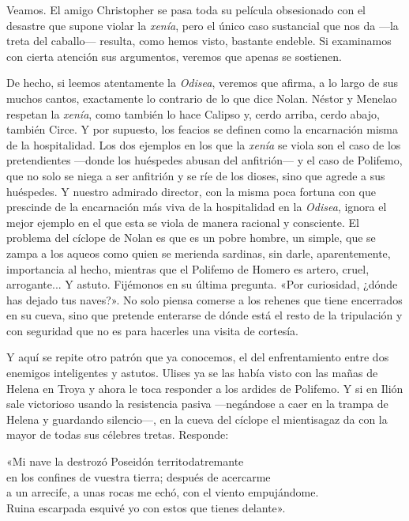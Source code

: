 Veamos. El amigo Christopher se pasa toda su película obsesionado con el desastre que supone violar la \emph{xenía}, pero el único caso sustancial que nos da ---la treta del caballo--- resulta, como hemos visto, bastante endeble. Si examinamos con cierta atención sus argumentos, veremos que apenas se sostienen.

De hecho, si leemos atentamente la \emph{Odisea}, veremos que afirma, a lo largo de sus muchos cantos, exactamente lo contrario de lo que dice Nolan. Néstor y Menelao respetan la \emph{xenía}, como también lo hace Calipso y, cerdo arriba, cerdo abajo, también Circe. Y por supuesto, los feacios se definen como la encarnación misma de la hospitalidad. Los dos ejemplos en los que la \emph{xenía} se viola son el caso de los pretendientes ---donde los huéspedes abusan del anfitrión--- y el caso de Polifemo, que no solo se niega a ser anfitrión y se ríe de los dioses, sino que agrede a sus huéspedes. Y nuestro admirado director, con la misma poca fortuna con que prescinde de la encarnación más viva de la hospitalidad en la \emph{Odisea}, ignora el mejor ejemplo en el que esta se viola de manera racional y consciente. El problema del cíclope de Nolan es que es un pobre hombre, un simple, que se zampa a los aqueos como quien se merienda sardinas, sin darle, aparentemente, importancia al hecho, mientras que el Polifemo de Homero es artero, cruel, arrogante... Y astuto. Fijémonos en su última pregunta. «Por curiosidad, ¿dónde has dejado tus naves?». No solo piensa comerse a los rehenes que tiene encerrados en su cueva, sino que pretende enterarse de dónde está el resto de la tripulación y con seguridad que no es para hacerles una visita de cortesía.

Y aquí se repite otro patrón que ya conocemos, el del enfrentamiento entre dos enemigos inteligentes y astutos. Ulises ya se las había visto con las mañas de Helena en Troya y ahora le toca responder a los ardides de Polifemo. Y si en Ilión sale victorioso usando la resistencia pasiva ---negándose a caer en la trampa de Helena y guardando silencio---, en la cueva del cíclope el mientisagaz da con la mayor de todas sus célebres tretas. Responde:

\begin{versocita}
«Mi nave la destrozó Poseidón territodatremante\\
en los confines de vuestra tierra; después de acercarme\\
a un arrecife, a unas rocas me echó, con el viento empujándome.\\
Ruina escarpada esquivé yo con estos que tienes delante».
\end{versocita}

